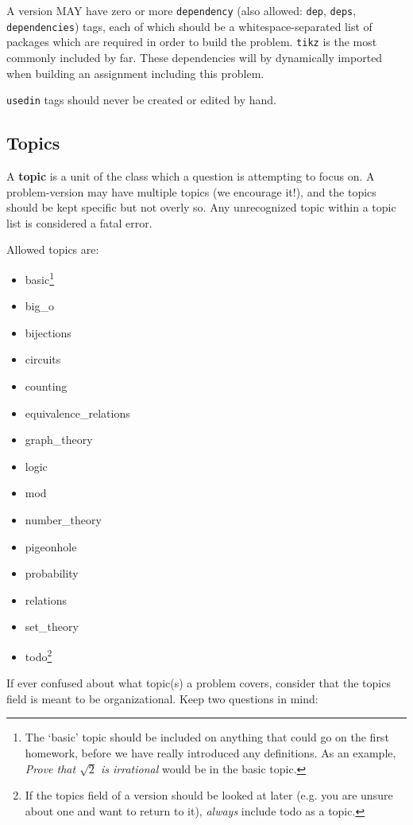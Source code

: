     A version MAY have zero or more \texttt{dependency} (also allowed: \texttt{dep}, \texttt{deps}, \texttt{dependencies}) tags, each of which should be a whitespace-separated list of packages which are required in order to build the problem. \texttt{tikz} is the most commonly included by far. These dependencies will by dynamically imported when building an assignment including this problem.
    
    \texttt{usedin} tags should never be created or edited by hand.
  
  \subsection{Topics}
    A \textbf{topic} is a unit of the class which a question is attempting to focus on. A problem-version may have multiple topics (we encourage it!), and the topics should be kept specific but not overly so. Any unrecognized topic within a topic list is considered a fatal error.
    
    Allowed topics are:
    \begin{itemize}\itemsep0pt
      \item basic\footnote{The `basic' topic should be included on anything that could go on the first homework, before we have really introduced any definitions. As an example, \textit{Prove that $\sqrt 2$ is irrational} would be in the basic topic.}
      \item big\_o
      \item bijections
      \item circuits
      \item counting
      \item equivalence\_relations
      \item graph\_theory
      \item logic
      \item mod
      \item number\_theory
      \item pigeonhole
      \item probability
      \item relations
      \item set\_theory
      \item todo\footnote{If the topics field of a version should be looked at later (e.g. you are unsure about one and want to return to it), \textit{always} include todo as a topic.}
    \end{itemize}
    
    If ever confused about what topic(s) a problem covers, consider that the topics field is meant to be organizational. Keep two questions in mind:
    
